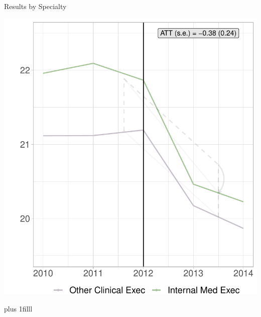 \documentclass[notes,11pt, aspectratio=169]{beamer}
\newcommand{\btVFill}{\vskip0pt plus 1filll}
\begin{document}
\begin{frame}{Results by Specialty}\label{specialty}
\begin{center}
    \includegraphics[width=.4\textwidth]{Objects/read_specialty_synth_graph.pdf}
\end{center}

    \btVFill

\hyperlink{main:readrates}{}
\end{frame}
\end{document}

